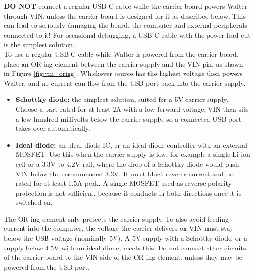 \documentclass[11pt]{article}
\begin{document}
\textbf{DO NOT} connect a regular USB-C cable while the carrier board powers Walter through VIN, unless the carrier board is designed for it as described below. This can lead to seriously damaging the board, the computer and external peripherals connected to it! For occasional debugging, a USB-C cable with the power lead cut is the simplest solution.\\

To use a regular USB-C cable while Walter is powered from the carrier board, place an OR-ing element between the carrier supply and the VIN pin, as shown in Figure \ref{fig:vin_oring}. Whichever source has the highest voltage then powers Walter, and no current can flow from the USB port back into the carrier supply.
\begin{itemize}
	\item \textbf{Schottky diode:} the simplest solution, suited for a 5V carrier supply. Choose a part rated for at least 2A with a low forward voltage. VIN then sits a few hundred millivolts below the carrier supply, so a connected USB port takes over automatically.
	\item \textbf{Ideal diode:} an ideal diode IC, or an ideal diode controller with an external MOSFET. Use this when the carrier supply is low, for example a single Li-ion cell or a 3.3V to 4.2V rail, where the drop of a Schottky diode would push VIN below the recommended 3.3V. It must block reverse current and be rated for at least 1.5A peak. A single MOSFET used as reverse polarity protection is not sufficient, because it conducts in both directions once it is switched on.
\end{itemize}

The OR-ing element only protects the carrier supply. To also avoid feeding current into the computer, the voltage the carrier delivers on VIN must stay below the USB voltage (nominally 5V). A 5V supply with a Schottky diode, or a supply below 4.5V with an ideal diode, meets this. Do not connect other circuits of the carrier board to the VIN side of the OR-ing element, unless they may be powered from the USB port.
\end{document}
